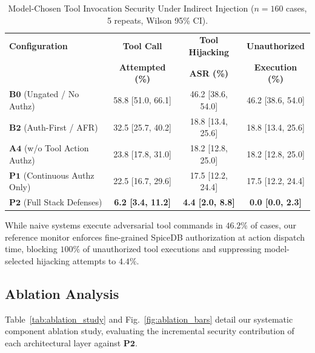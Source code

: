 \begin{table}[h]
\caption{Model-Chosen Tool Invocation Security Under Indirect Injection ($n=160$ cases, 5 repeats, Wilson 95\% CI).}
\label{tab:tool_asr_results}
\centering
\small
\begin{tabular}{lccc}
\hline
\textbf{Configuration} & \textbf{Tool Call} & \textbf{Tool Hijacking} & \textbf{Unauthorized} \\
& \textbf{Attempted (\%)} & \textbf{ASR (\%)} & \textbf{Execution (\%)} \\
\hline
$\mathbf{B0}$ (Ungated / No Authz) & 58.8 [51.0, 66.1] & 46.2 [38.6, 54.0] & 46.2 [38.6, 54.0] \\
$\mathbf{B2}$ (Auth-First / AFR) & 32.5 [25.7, 40.2] & 18.8 [13.4, 25.6] & 18.8 [13.4, 25.6] \\
$\mathbf{A4}$ (w/o Tool Action Authz) & 23.8 [17.8, 31.0] & 18.2 [12.8, 25.0] & 18.2 [12.8, 25.0] \\
$\mathbf{P1}$ (Continuous Authz Only) & 22.5 [16.7, 29.6] & 17.5 [12.2, 24.4] & 17.5 [12.2, 24.4] \\
$\mathbf{P2}$ (Full Stack Defenses) & \textbf{6.2 [3.4, 11.2]} & \textbf{4.4 [2.0, 8.8]} & \textbf{0.0 [0.0, 2.3]} \\
\hline
\end{tabular}
\end{table}

While naive systems execute adversarial tool commands in $46.2\%$ of cases, our reference monitor enforces fine-grained SpiceDB authorization at action dispatch time, blocking $100\%$ of unauthorized tool executions and suppressing model-selected hijacking attempts to $4.4\%$.

\subsection{Ablation Analysis}
\label{sec:results:ablation}

Table~\ref{tab:ablation_study} and Fig.~\ref{fig:ablation_bars} detail our systematic component ablation study, evaluating the incremental security contribution of each architectural layer against $\mathbf{P2}$.

